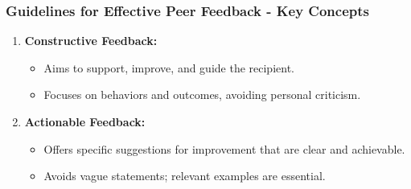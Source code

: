 \documentclass[aspectratio=169]{beamer}
\begin{document}
\begin{frame}[fragile]
    \frametitle{Guidelines for Effective Peer Feedback - Key Concepts}
    \begin{enumerate}
        \item \textbf{Constructive Feedback:}
        \begin{itemize}
            \item Aims to support, improve, and guide the recipient.
            \item Focuses on behaviors and outcomes, avoiding personal criticism.
        \end{itemize}
        
        \item \textbf{Actionable Feedback:}
        \begin{itemize}
            \item Offers specific suggestions for improvement that are clear and achievable.
            \item Avoids vague statements; relevant examples are essential.
        \end{itemize}
    \end{enumerate}
\end{frame}
\end{document}
